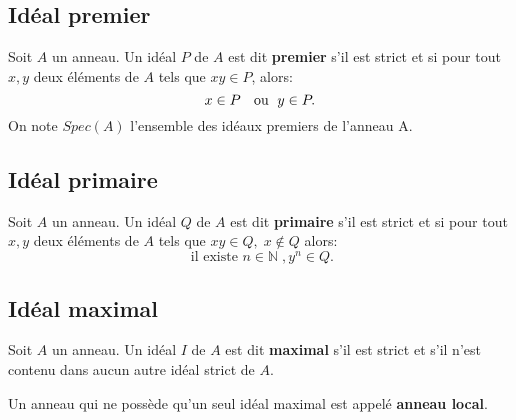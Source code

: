 \subsection{Idéal premier}
\begin{madefinition}
	Soit $A$ un anneau. Un idéal $P$ de $A$ est dit \textbf{premier} s'il est strict et si pour tout $x,y$ deux éléments de $A$ tels que $xy \in P$, alors: $$x \in P \text{ \; ou \;} y\in P.$$
	On note $Spec(A)$ l’ensemble des idéaux premiers de l'anneau A. 
\end{madefinition}
\subsection{Idéal primaire}
\begin{madefinition}
	Soit $A$ un anneau. Un idéal $Q$ de $A$ est dit \textbf{primaire} s'il est strict et si pour tout $x,y$ deux éléments de $A$ tels que $xy \in Q, \; x \notin Q $ alors: $$\text{ il existe } n \in \mathbb{N} \;, y^{n} \in Q.$$
\end{madefinition}
\subsection{Idéal maximal}
\begin{madefinition}
	Soit $A$ un anneau. Un idéal $I$ de $A$ est dit \textbf{maximal} s'il est strict et s'il n'est contenu dans aucun autre idéal strict de $A$.
\end{madefinition}
\begin{maremarque}
	Un anneau qui ne possède qu'un seul idéal maximal est appelé \textbf{anneau local}.
\end{maremarque}
